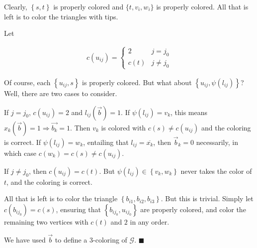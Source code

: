 \documentclass[a4paper, 12pt]{article}
\begin{document}
Clearly, $\left\{ s, t \right\} $ is properly colored and $\{t, v_i, w_i\}$ is 
properly colored. All that is left is to color the triangles 
with tips.

Let 

\begin{align*}
    c(u_{ij}) = \begin{cases}
        2 & j = j_0 \\ 
        c(t) & j \neq j_0
    \end{cases}
\end{align*}

Of course, each $\left\{ u_{ij}, s \right\} $ is properly colored. But what about 
$\left\{ u_{ij}, \psi(l_{ij}) \right\} $? Well, there are two cases to consider. 

If $j = j_0$, $c(u_{ij}) = 2$ and $l_{ij}(\overrightarrow{b}) = 1$. If
$\psi(l_{ij}) = v_k$, this means $x_{k}(\overrightarrow{b}) = 1 \Rightarrow
\overrightarrow{b_k} = 1$. Then $v_k$ is colored with $c(s) \neq c(u_{ij})$ and the coloring 
is correct. If $\psi(l_{ij}) = w_k$, entailing that $l_{ij} = \overline{x_k}$, then 
$\overrightarrow{b}_k = 0$ necessarily, in which case $c(w_k) = c(s) \neq c(u_{ij})$.

If $j \neq j_0$, then $c(u_{ij}) = c(t)$. But $\psi(l_{ij}) \in \left\{ v_k, w_k \right\} $ never
takes the color of $t$, and the coloring is correct.

All that is left is to color the triangle $\left\{ b_{i1}, b_{i2}, b_{i 3} \right\} $.
But this is trivial. Simply let $c(b_{i j_0}) = c(s)$, ensuring 
that $\left\{ b_{i j_0}, u_{i j_0} \right\} $ are properly colored,
and color the remaining two vertices with $c(t)$ and $2$ in 
any order.

We have used $\overrightarrow{b}$ to define a 3-coloring of $\mathcal{G}$. $\blacksquare$
\end{document}
